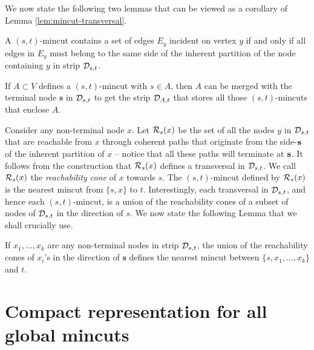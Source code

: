 We now state the following two lemmas that can be viewed as a corollary of Lemma \ref{lem:mincut-transversal}.

\begin{lemma}
A $(s,t)$-mincut contains a set of edges $E_y$ incident on vertex $y$ if and only if all edges in $E_y$ must belong to the same side of the inherent partition of the node containing $y$ in strip ${\cal D}_{s,t}$.
\label{lem:E_y-edges-same-side}
\end{lemma}

\begin{lemma} 
If $A\subset V$ defines a $(s,t)$-mincut with $s\in A$, then $A$ can be merged with the terminal node ${\mathbf s}$ in ${\cal D}_{s,t}$ to get the strip ${\cal D}_{A,t}$ that stores all those $(s,t)$-mincuts that enclose $A$.
\label{lem:strip-A}
\end{lemma}


Consider any non-terminal node $x$. Let ${\cal R}_s(x)$ be the set of all the nodes $y$ in ${\cal D}_{s,t}$ that are reachable from $x$ through coherent paths that originate from the side-${\bf s}$ of the inherent partition of $x$ -- notice that all these paths will terminate at ${\bf s}$. 
It follows from the construction that ${\cal R}_s(x)$ defines a transversal in
${\cal D}_{s,t}$. We call ${\cal R}_s(x)$ the \textit{reachability cone} of $x$ towards $s$. 
The $(s,t)$-mincut defined by ${\cal R}_s(x)$ is the nearest mincut from $\{s,x\}$ to $t$. 
Interestingly, each transversal in ${\cal D}_{s,t}$, and hence each $(s,t)$-mincut, is a union of the reachability cones of a subset of nodes of ${\cal D}_{s,t}$ in the direction of $s$. We now state the following Lemma that we shall crucially use.

\begin{lemma}
If $x_1,\ldots, x_k$ are any non-terminal nodes in strip ${\cal D}_{s,t}$,  the union of the reachability cones of $x_i$'s in the direction of ${\mathbf s}$ defines the nearest mincut between $\{s, x_1,\ldots, x_k\}$ and $t$.
\label{lem:reachability-cones}
\end{lemma} 


\section{Compact representation for all global mincuts} \label{appendix:cactus}

